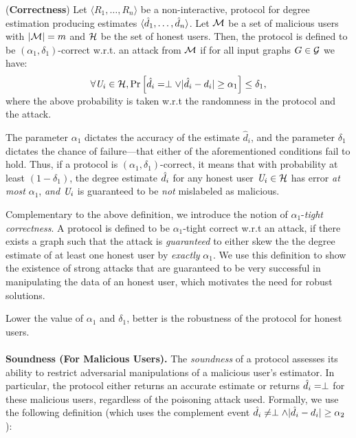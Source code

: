 \begin{defn}\label{def:correct}(\textbf{Correctness}) Let 
  $\langle R_1, \ldots, R_n\rangle$ be a non-interactive, \ldp{} protocol for degree estimation producing estimates $\langle \hat{d}_1, \ldots, \hat{d}_n\rangle$. Let $\mathcal{M}$ be a set of malicious users with $|\mathcal{M}| = m$ and $\mathcal{H}$ be the set of honest users. 
Then, the protocol is defined to be $(\alpha_1,\delta_1)$-correct w.r.t. an attack from $\mathcal{M}$ if for all input graphs $G\in \mathcal{G}$ we have:
  \begin{gather}  \vspace{-0.2cm}  
    \forall \DO_i \in \calH, \mathrm{Pr}\left[\hat{d}_i = \bottom \vee
    |\hat{d}_i-d_i|\geq \alpha_1\right]\leq \delta_1,\label{eq:correct1}
  \end{gather}
where the above probability is taken w.r.t  the randomness in the protocol and the attack.
\end{defn}
The parameter $\alpha_1$ dictates the accuracy of the estimate $\hat{d}_i$, and the parameter $\delta_1$ dictates the chance of failure---that either of the aforementioned conditions fail to hold. Thus, if a protocol is $(\alpha_1,\delta_1)$-correct, it means that with probability at least $(1-\delta_1)$, 
the degree estimate $\hat{d}_i$ for any honest user $\textit{U}_i \in \mathcal{H}$ has error \textit{at most} $\alpha_1$, \textit{and} $\textit{U}_i$ is guaranteed to be \textit{not} mislabeled as malicious.

Complementary to the above definition, we introduce the notion of $\alpha_1$-\textit{tight correctness}. A protocol is defined to be $\alpha_1$-tight correct w.r.t an attack, if there exists a graph such that the attack is \textit{guaranteed} to either skew the  the degree estimate of at least one honest user by \textit{exactly} $\alpha_1$.  We use this definition to show the existence of strong attacks that are guaranteed to be very successful in manipulating the data of an honest user, which motivates the need for robust solutions. 

Lower the value of
$\alpha_1$ and $\delta_1$, better is the robustness of the protocol for honest users.  \vspace{-0.2cm}  \\\\ 
\noindent\textbf{Soundness (For Malicious Users). } The \textit{soundness} of a protocol assesses its ability to restrict adversarial manipulations of a malicious user's estimator. In particular, the protocol either returns an accurate estimate or returns $\hat{d}_i = \perp$ for these malicious users, regardless of the poisoning attack used. Formally, we use the following definition (which uses the complement event $\hat{d}_i \neq \perp \wedge |\hat{d}_i - d_i| \geq \alpha_2$):

